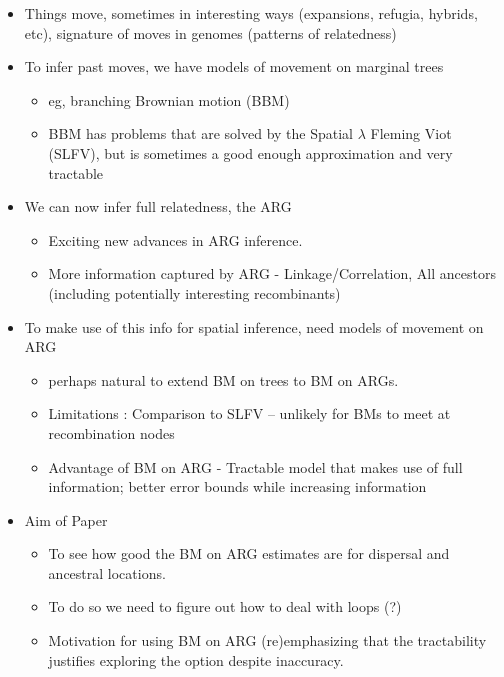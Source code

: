 \begin{itemize}
    \item Things move, sometimes in interesting ways (expansions, refugia, hybrids, etc), signature of moves in genomes (patterns of relatedness)
    \item To infer past moves, we have models of movement on marginal trees
    \begin{itemize}
        \item eg, branching Brownian motion (BBM)
        \item BBM has problems that are solved by the Spatial $\lambda$ Fleming Viot (SLFV), but is sometimes a good enough approximation and very tractable
    \end{itemize}
    \item We can now infer full relatedness, the ARG
    \begin{itemize}
        \item Exciting new advances in ARG inference. 
        \item More information captured by ARG - Linkage/Correlation, All ancestors (including potentially interesting recombinants)
    \end{itemize}
    \item To make use of this info for spatial inference, need models of movement on ARG 
    \begin{itemize}
        \item perhaps natural to extend BM on trees to BM on ARGs. 
        \item Limitations : Comparison to SLFV -- unlikely for BMs to meet at recombination nodes 
        \item Advantage of BM on ARG - Tractable model that makes use of full information; better error bounds while increasing information 
    \end{itemize}
    \item Aim of Paper
    \begin{itemize}
        \item To see how good the BM on ARG estimates are for dispersal and ancestral locations.
        \item To do so we need to figure out how to deal with loops (?)
        \item Motivation for using BM on ARG (re)emphasizing that the tractability justifies exploring the option despite inaccuracy.
    \end{itemize}
    
    
\end{itemize}


